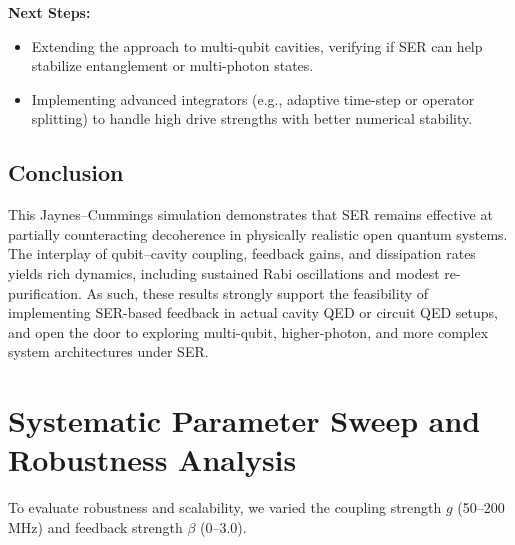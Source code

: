 \documentclass{article}
\begin{document}
\textbf{Next Steps:}
\begin{itemize}
    \item Extending the approach to multi-qubit cavities, verifying if SER can help stabilize entanglement or multi-photon states.
    \item Implementing advanced integrators (e.g., adaptive time-step or operator splitting) to handle high drive strengths with better numerical stability.
\end{itemize}

\subsection{Conclusion}
This Jaynes--Cummings simulation demonstrates that SER remains effective at partially counteracting decoherence in physically realistic open quantum systems. The interplay of qubit--cavity coupling, feedback gains, and dissipation rates yields rich dynamics, including sustained Rabi oscillations and modest re-purification. As such, these results strongly support the feasibility of implementing SER-based feedback in actual cavity QED or circuit QED setups, and open the door to exploring multi-qubit, higher-photon, and more complex system architectures under SER.

\section{Systematic Parameter Sweep and Robustness Analysis}
To evaluate robustness and scalability, we varied the coupling strength $g$ (50–200 MHz) and feedback strength $\beta$ (0–3.0).
\end{document}
